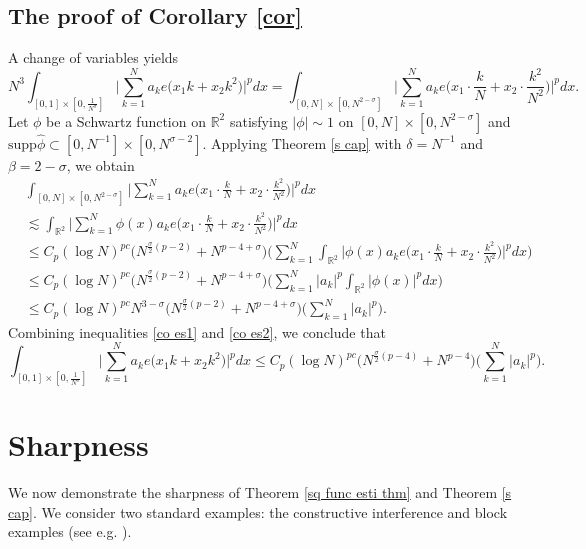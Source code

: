 \documentclass[reqno,centertags,11pt,a4paper]{amsart}
\begin{document}
\subsection{The proof of Corollary \ref{cor}}
    A change of variables yields
    \begin{equation}\label{co es1}
     N^3\int_{[0,1]\times[0,\frac{1}{N^\sigma}]}\bigg|\sum_{k=1}^Na_ke\bigl(x_1k+x_2k^2\bigr)\bigg|^pdx=\int_{[0,N]\times[0,N^{2-\sigma}]}\bigg|\sum_{k=1}^Na_ke\bigl(x_1\cdot\frac{k}{N}+x_2\cdot\frac{k^2}{N^2}\bigr)\bigg|^pdx.
    \end{equation}
    Let $\phi$ be a Schwartz function on $\mathbb{R}^2$ satisfying $|\phi|\sim1$ on $[0,N]\times[0,N^{2-\sigma}]$ and $\text{supp} \widehat{\phi}\subset [0,N^{-1}]\times[0,N^{\sigma-2}]$.
    Applying Theorem \ref{s cap} with $\delta=N^{-1}$ and $\beta=2-\sigma$, we obtain
    \begin{align}\label{co es2}
    \nonumber&\int_{[0,N]\times[0,N^{2-\sigma}]}\bigg|\sum_{k=1}^Na_ke\bigl(x_1\cdot\frac{k}{N}+x_2\cdot\frac{k^2}{N^2}\bigr)\bigg|^pdx\\
\nonumber&\lesssim\int_{\mathbb{R}^2}\bigg|\sum_{k=1}^N\phi(x)a_ke\bigl(x_1\cdot\frac{k}{N}+x_2\cdot\frac{k^2}{N^2}\bigr)\bigg|^pdx\\
\nonumber&\leq C_p (\log N)^{pc}\bigg(N^{\frac{\sigma}{2}(p-2)}+N^{p-4+\sigma}\bigg)\bigg(\sum_{k=1}^N\int_{\mathbb{R}^2}\bigg|\phi(x)a_ke\bigl(x_1\cdot\frac{k}{N}+x_2\cdot\frac{k^2}{N^2}\bigr)\bigg|^pdx\bigg)\\
\nonumber&\leq C_p (\log N)^{pc}\bigg(N^{\frac{\sigma}{2}(p-2)}+N^{p-4+\sigma}\bigg)\bigg(\sum_{k=1}^N|a_k|^p\int_{\mathbb{R}^2}|\phi(x)|^pdx\bigg)\\
&\leq C_p (\log N)^{pc} N^{3-\sigma}\bigg(N^{\frac{\sigma}{2}(p-2)}+N^{p-4+\sigma}\bigg)\bigg(\sum_{k=1}^N|a_k|^p\bigg).
    \end{align}
Combining inequalities \eqref{co es1} and \eqref{co es2}, we conclude that
\begin{equation}
  \int_{[0,1]\times[0,\frac{1}{N^\sigma}]}\bigg|\sum_{k=1}^Na_ke\bigl(x_1k+x_2k^2\bigr)\bigg|^pdx\leq C_p (\log N)^{pc}\bigg(N^{\frac{\sigma}{2}(p-4)}+N^{p-4}\bigg)\bigg(\sum_{k=1}^N|a_k|^p\bigg).
\end{equation}

\section{ Sharpness }\label{S4}
We now demonstrate the sharpness of Theorem \ref{sq func esti thm} and Theorem \ref{s cap}. We consider two standard examples: the constructive interference and block examples (see e.g. \cite{FGM23}).
\end{document}
